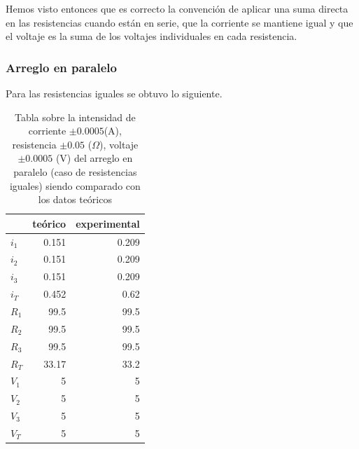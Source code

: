\documentclass[article,12pt]{elsarticle}
\begin{document}
Hemos visto entonces que es correcto la convención de aplicar una suma directa en las resistencias cuando están en serie, que la corriente se mantiene igual y que el voltaje es la suma de los voltajes individuales en cada resistencia.

\subsubsection{Arreglo en paralelo}
Para las resistencias iguales se obtuvo lo siguiente.

\begin{table}[h]
\centering
\begin{tabular}{|l|r|r|}
\hline
     & \multicolumn{1}{l|}{teórico} & \multicolumn{1}{l|}{experimental} \\ \hline
$i_1$ & 0.151                        & 0.209                             \\ \hline
$i_2$ & 0.151                        & 0.209                             \\ \hline
$i_3$ & 0.151                        & 0.209                             \\ \hline
$i_T$ & 0.452                        & 0.62                              \\ \hline
$R_1$ & 99.5                         & 99.5                              \\ \hline
$R_2$ & 99.5                         & 99.5                              \\ \hline
$R_3$ & 99.5                         & 99.5                              \\ \hline
$R_T$ & 33.17                  & 33.2                              \\ \hline
$V_1$ & 5                            & 5                                 \\ \hline
$V_2$ & 5                            & 5                                 \\ \hline
$V_3$ & 5                            & 5                                 \\ \hline
$V_T$ & 5                            & 5                                 \\ \hline
\end{tabular}
\caption{Tabla sobre la intensidad de corriente $\pm 0.0005$(A), resistencia $\pm 0.05$ ($\Omega$), voltaje $\pm 0.0005$ (V) del arreglo en paralelo (caso de resistencias iguales) siendo comparado con los datos teóricos}
\end{table}
\end{document}
